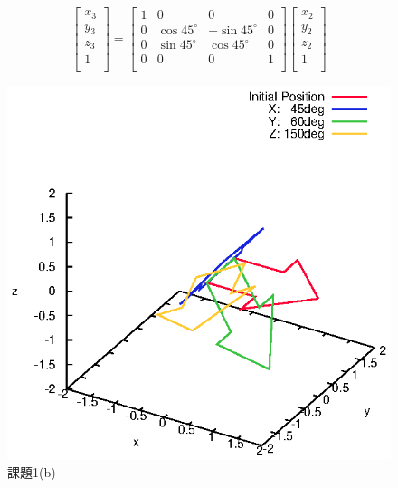 \documentclass[a4paper,10pt]{jsarticle}
\begin{document}
\begin{eqnarray}
\label{eq:f}
  \left[
    \begin{array}{c}
      x_3\\
      y_3\\
      z_3\\
      1\\
    \end{array}
  \right] =
  \left[
    \begin{array}{cccc}
      1 & 0 & 0 & 0 \\
      0 & \cos{45^\circ} & -\sin{45^\circ} & 0\\
      0 & \sin{45^\circ} & \cos{45^\circ} & 0\\
      0 & 0 & 0 & 1\\
    \end{array}
  \right]\left[
    \begin{array}{c}
      x_2\\
      y_2\\
      z_2\\
      1\\
    \end{array}
  \right]
\end{eqnarray}

\begin{figure}[tb]
  \begin{center}
    \includegraphics[clip,width=14cm]{fig/eps/1(b).eps}
  \end{center}
  \caption{課題1(b)}
  \label{fig:課題1(b)}
\end{figure}
\end{document}
